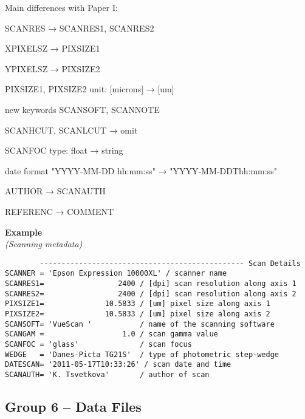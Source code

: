 \documentclass[11pt]{ivoa}
\newenvironment{fitsexample}[1]
{\bigskip\noindent\textbf{Example}\\\textit{(#1\smallskip)}}
{\medskip}
\begin{document}
Main differences with Paper I:

SCANRES → SCANRES1, SCANRES2

XPIXELSZ → PIXSIZE1

YPIXELSZ → PIXSIZE2

PIXSIZE1, PIXSIZE2 unit: [microns] → [um]

new keywords SCANSOFT, SCANNOTE

SCANHCUT, SCANLCUT → omit

SCANFOC type: float → string

date format "YYYY-MM-DD hh:mm:ss" → "YYYY-MM-DDThh:mm:ss"

AUTHOR → SCANAUTH

REFERENC → COMMENT


\begin{fitsexample}{Scanning metadata}
\begin{lstlisting}
        ----------------------------------------------- Scan Details
SCANNER = 'Epson Expression 10000XL' / scanner name
SCANRES1=                 2400 / [dpi] scan resolution along axis 1
SCANRES2=                 2400 / [dpi] scan resolution along axis 2
PIXSIZE1=              10.5833 / [um] pixel size along axis 1
PIXSIZE2=              10.5833 / [um] pixel size along axis 2
SCANSOFT= 'VueScan '           / name of the scanning software
SCANGAM =                  1.0 / scan gamma value
SCANFOC = 'glass'              / scan focus
WEDGE   = 'Danes-Picta TG21S'  / type of photometric step-wedge
DATESCAN= '2011-05-17T10:33:26' / scan date and time
SCANAUTH= 'K. Tsvetkova'       / author of scan
\end{lstlisting}
\end{fitsexample}


\subsection{Group 6 – Data Files}
\end{document}
